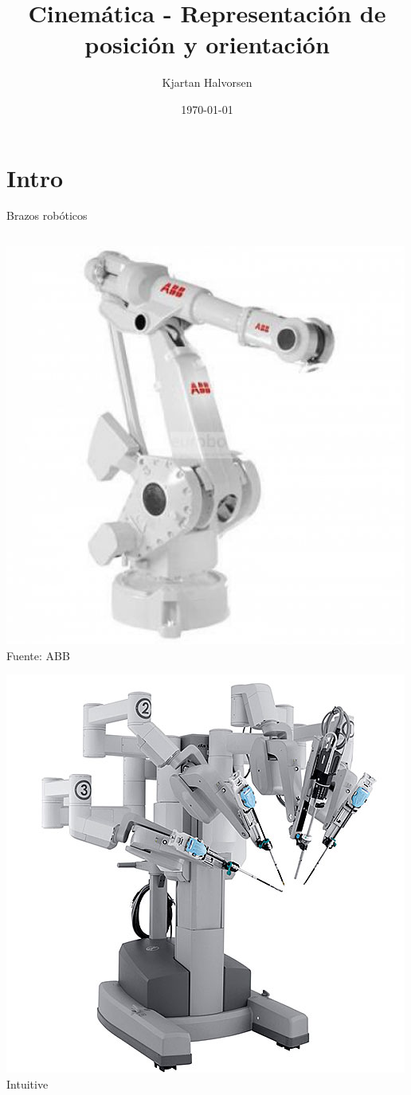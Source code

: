 \documentclass[presentation,aspectratio=169]{beamer}
\author{Kjartan Halvorsen}
\date{\today}
\title{Cinemática - Representación de posición y orientación}
\begin{document}
\maketitle

\section{Intro}
\label{sec:orgd2132b3}
\begin{frame}[label={sec:org0d4980f}]{Brazos robóticos}
\begin{columns}
\begin{column}{0.5\columnwidth}
\begin{center}
 \includegraphics[width=.5\linewidth]{../figures/IRB_4400.jpg}\\
 \tiny Fuente: ABB
\end{center}

\pause

\begin{center}
 \includegraphics[width=.5\linewidth]{../figures/davinci.jpg}\\
\tiny Intuitive
\end{center}

\pause
\end{column}



\end{columns}
\end{frame}
\end{document}
